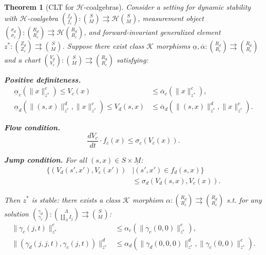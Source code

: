\documentclass[letterpaper, 10 pt, conference]{IEEEconf}
\newtheorem{thm}{Theorem}
\theoremstyle{definition}
\newcommand{\maps}{\colon}
\newcommand{\chart}{\rightrightarrows}
\newcommand{\K}{\mathcal K}
\newcommand{\functor}[1]{\mathcal{#1}}
\renewcommand{\H}{\functor{H}}
\begin{document}
\begin{thm}[CLT for $\H$-coalgebras]
\label{thm:CLT_hybrid}
    Consider a setting for dynamic stability with $\H$-coalgebra $\binom{f_d}{f_c} \maps \binom{S}{M} \chart \H\binom{S}{M}$, measurement object $\binom{\sigma_d}{\sigma_c} \maps \binom{R_d}{R_c} \chart \H\binom{R_d}{R_c}$, and forward-invariant generalized element $z^* \maps \binom{Z_d}{Z_c} \chart \binom{S}{M}$. Suppose there exist class $\K$ morphisms $\underline{\alpha}, \overline{\alpha} \maps \binom{R_d}{R_c} \chart \binom{R_d}{R_c}$ and a chart $\binom{V_d}{V_c} \maps \binom{S}{M} \chart \binom{R_d}{R_c}$ satisfying:

    \textbf{Positive definiteness.}
    \begin{align}
        \underline{\alpha}_c(\|x\|^c_{z^*}) \leq V_c(x) &\leq \overline{\alpha}_c(\|x\|^c_{z^*}), \label{eq:pd_c} \\
        \underline{\alpha}_d(\|(s,x)\|^d_{z^*}, \|x\|^c_{z^*}) \leq V_d(s,x) &\leq \overline{\alpha}_d(\|(s,x)\|^d_{z^*}, \|x\|^c_{z^*}). \nonumber
    \end{align}
    \vspace{-6mm}

    \textbf{Flow condition.}
    \begin{equation}
        \frac{dV_c}{dt} \cdot f_c(x) \leq \sigma_c(V_c(x)). \label{eq:flow}
    \end{equation}

    \textbf{Jump condition.} 
    For all $(s,x) \in S \times \underline{M}$:
    \begin{align}
        \{(V_d(s',x'), V_c(x')) &\mid (s',x') \in f_d(s,x)\} \nonumber
        \\&\leq \sigma_d(V_d(s,x), V_c(x)). 
        \label{eq:jump}
    \end{align}

    Then $z^*$ is stable: there exists a class $\K$ morphism $\alpha \maps \binom{R_d}{R_c} \chart \binom{R_d}{R_c}$ s.t. for any solution $\binom{\gamma_d}{\gamma_c} \maps \binom{\Lambda}{\coprod_\Lambda I_j} \chart \binom{S}{M}$:
    \begin{align}
        \|\gamma_c(j,t)\|^c_{z^*} &\leq \alpha_c(\|\gamma_c(0,0)\|^c_{z^*}), \label{eq:stab_c} \\
        \|(\gamma_d(j,j,t), \gamma_c(j,t))\|^d_{z^*} &\leq \alpha_d(\|\gamma_d(0,0,0)\|^d_{z^*}, \|\gamma_c(0,0)\|^c_{z^*}). \nonumber
    \end{align}
\end{thm}
\end{document}
